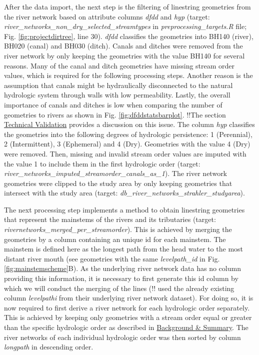 \documentclass[fleqn,10pt]{wlscirep}
\begin{document}
After the data import, the next step is the filtering of linestring geometries from the river network based on attribute columns \emph{dfdd} and \emph{hyp} (target: \emph{river\_networks\_non\_dry\_selected\_streamtypes} in \emph{preprocessing\_targets.R} file; Fig. \ref{fig:projectdirtree}, line 30). \emph{dfdd} classifies the geometries into BH140 (river), BH020 (canal) and BH030 (ditch). Canals and ditches were removed from the river network by only keeping the geometries with the value BH140 for several reasons. Many of the canal and ditch geometries have missing stream order values, which is required for the following processing steps. Another reason is the assumption that canals might be hydraulically disconnected to the natural hydrologic system through walls with low permeability. Lastly, the overall importance of canals and ditches is low when comparing the number of geometries to rivers as shown in Fig. \ref{fig:dfddstatsbarplot}. !!The section \protect\hyperlink{technical-validation}{Technical Validation} provides a discussion on this issue. The column \emph{hyp} classifies the geometries into the following degrees of hydrologic persistence: 1 (Perennial), 2 (Intermittent), 3 (Ephemeral) and 4 (Dry). Geometries with the value 4 (Dry) were removed. Then, missing and invalid stream order values are imputed with the value 1 to include them in the first hydrologic order (target: \emph{river\_networks\_imputed\_streamorder\_canals\_as\_1}). The river network geometries were clipped to the study area by only keeping geometries that intersect with the study area (target: \emph{db\_river\_networks\_strahler\_studyarea}).

The next processing step implements a method to obtain linestring geometries that represent the mainstems of the rivers and its tributaries (target: \emph{rivernetworks\_merged\_per\_streamorder}). This is achieved by merging the geometries by a column containing an unique id for each mainstem. The mainstem is defined here as the longest path from the head water to the most distant river mouth (see geometries with the same \emph{levelpath\_id} in Fig. \ref{fig:mainstemscheme}B). As the underlying river network data has no column providing this information, it is necessary to first generate this id column by which we will conduct the merging of the lines (!!\cite{belitz_multiorder_2019} used the already existing column \emph{levelpathi} from their underlying river network dataset). For doing so, it is now required to first derive a river network for each hydrologic order separately. This is achieved by keeping only geometries with a stream order equal or greater than the specific hydrologic order as described in \protect\hyperlink{background-summary}{Background \& Summary}. The river networks of each individual hydrologic order was then sorted by column \emph{longpath} in descending order.
\end{document}

